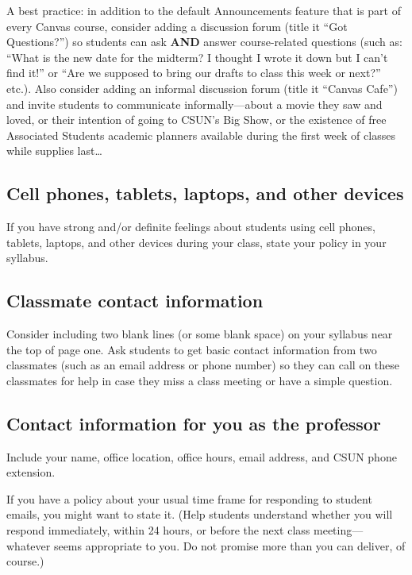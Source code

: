 \documentclass[
  letterpaper,
  DIV=11,
  numbers=noendperiod]{scrartcl}
\begin{document}
A best practice: in addition to the default Announcements feature that
is part of every Canvas course, consider adding a discussion forum
(title it ``Got Questions?'') so students can ask \textbf{AND} answer
course-related questions (such as: ``What is the new date for the
midterm? I thought I wrote it down but I can't find it!'' or ``Are we
supposed to bring our drafts to class this week or next?'' etc.). Also
consider adding an informal discussion forum (title it ``Canvas Cafe'')
and invite students to communicate informally---about a movie they saw
and loved, or their intention of going to CSUN's Big Show, or the
existence of free Associated Students academic planners available during
the first week of classes while supplies last\ldots{}

\subsection{Cell phones, tablets, laptops, and other
devices}\label{cell-phones-tablets-laptops-and-other-devices}

If you have strong and/or definite feelings about students using cell
phones, tablets, laptops, and other devices during your class, state
your policy in your syllabus.

\subsection{Classmate contact
information}\label{classmate-contact-information}

Consider including two blank lines (or some blank space) on your
syllabus near the top of page one. Ask students to get basic contact
information from two classmates (such as an email address or phone
number) so they can call on these classmates for help in case they miss
a class meeting or have a simple question.

\subsection{Contact information for you as the
professor}\label{contact-information-for-you-as-the-professor}

Include your name, office location, office hours, email address, and
CSUN phone extension.

If you have a policy about your usual time frame for responding to
student emails, you might want to state it. (Help students understand
whether you will respond immediately, within 24 hours, or before the
next class meeting---whatever seems appropriate to you. Do not promise
more than you can deliver, of course.)
\end{document}

